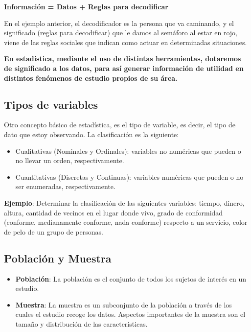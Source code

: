 \documentclass[
]{book}
\providecommand{\tightlist}{%
  \setlength{\itemsep}{0pt}\setlength{\parskip}{0pt}}
\theoremstyle{definition}
\theoremstyle{definition}
\theoremstyle{definition}
\theoremstyle{definition}
\theoremstyle{remark}
\begin{document}
\textbf{Información = Datos + Reglas para decodificar}

En el ejemplo anterior, el decodificador es la persona que va caminando, y el significado (reglas para decodificar) que le damos al semáforo al estar en rojo, viene de las reglas sociales que indican como actuar en determinadas situaciones.

\textbf{En estadística, mediante el uso de distintas herramientas, dotaremos de significado a los datos, para así generar información de utilidad en distintos fenómenos de estudio propios de su área.}

\hypertarget{tipos-de-variables}{%
\subsection*{Tipos de variables}\label{tipos-de-variables}}

Otro concepto básico de estadística, es el tipo de variable, es decir, el tipo de dato que estoy observando. La clasificación es la siguiente:

\begin{itemize}
\tightlist
\item
  Cualitativas (Nominales y Ordinales): variables no numéricas que pueden o no llevar un orden, respectivamente.
\item
  Cuantitativas (Discretas y Continuas): variables numéricas que pueden o no ser enumeradas, respectivamente.
\end{itemize}

\textbf{Ejemplo}: Determinar la clasificación de las siguientes variables: tiempo, dinero, altura, cantidad de vecinos en el lugar donde vivo, grado de conformidad (conforme, medianamente conforme, nada conforme) respecto a un servicio, color de pelo de un grupo de personas.

\hypertarget{poblaciuxf3n-y-muestra}{%
\subsection*{Población y Muestra}\label{poblaciuxf3n-y-muestra}}

\begin{itemize}
\tightlist
\item
  \textbf{Población}: La población es el conjunto de todos los sujetos de interés en un estudio.
\item
  \textbf{Muestra}: La muestra es un subconjunto de la población a través de los cuales el estudio recoge los datos. Aspectos importantes de la muestra son el tamaño y distribución de las características.
\end{itemize}
\end{document}
